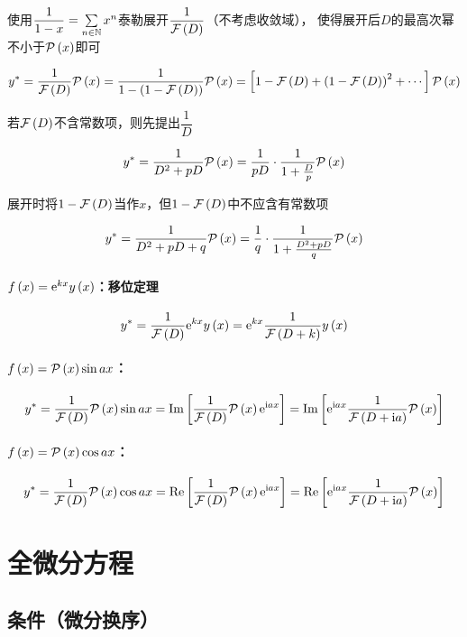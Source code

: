 \documentclass{article}
\begin{document}
使用$\dfrac1{1-x}=\sum\limits_{n\in\mathbb N}x^n$泰勒展开$\dfrac1{\mathcal F\left(D\right)}$（不考虑收敛域），
使得展开后$D$的最高次幂不小于$\mathcal P\left(x\right)$即可

\[y^*=\frac1{\mathcal F\left(D\right)}\mathcal P\left(x\right)=\frac1{1-\left(1-\mathcal F\left(D\right)\right)}\mathcal P\left(x\right)=\left[1-\mathcal F\left(D\right)+\left(1-\mathcal F\left(D\right)\right)^2+\cdots\right]\mathcal P\left(x\right)\]

若$\mathcal F\left(D\right)$不含常数项，则先提出$\dfrac1D$

\[y^*=\frac1{D^2+pD}\mathcal P\left(x\right)=\frac1{pD}\cdot\frac1{1+\frac Dp}\mathcal P\left(x\right)\]

展开时将$1-\mathcal F\left(D\right)$当作$x$，但$1-\mathcal F\left(D\right)$中不应含有常数项

\[y^*=\frac1{D^2+pD+q}\mathcal P\left(x\right)=\frac1q\cdot\frac1{1+\frac{D^2+pD}q}\mathcal P\left(x\right)\]

\paragraph{$f\left(x\right)=\mathrm e^{kx}y\left(x\right)$：移位定理}

\[y^*=\frac1{\mathcal F\left(D\right)}\mathrm e^{kx}y\left(x\right)=\mathrm e^{kx}\frac1{\mathcal F\left(D+k\right)}y\left(x\right)\]

\paragraph{$f\left(x\right)=\mathcal P\left(x\right)\sin ax$：}

\[y^*=\frac1{\mathcal F\left(D\right)}\mathcal P\left(x\right)\sin ax=\operatorname{Im}\left[\frac1{\mathcal F\left(D\right)}\mathcal P\left(x\right)\mathrm e^{\mathrm i ax}\right]=\operatorname{Im}\left[\mathrm e^{\mathrm i ax}\frac1{\mathcal F\left(D+\mathrm i a\right)}\mathcal P\left(x\right)\right]\]

\paragraph{$f\left(x\right)=\mathcal P\left(x\right)\cos ax$：}

\[y^*=\frac1{\mathcal F\left(D\right)}\mathcal P\left(x\right)\cos ax=\operatorname{Re}\left[\frac1{\mathcal F\left(D\right)}\mathcal P\left(x\right)\mathrm e^{\mathrm i ax}\right]=\operatorname{Re}\left[\mathrm e^{\mathrm i ax}\frac1{\mathcal F\left(D+\mathrm i a\right)}\mathcal P\left(x\right)\right]\]

\section{全微分方程}

\subsection{条件（微分换序）}
\end{document}
